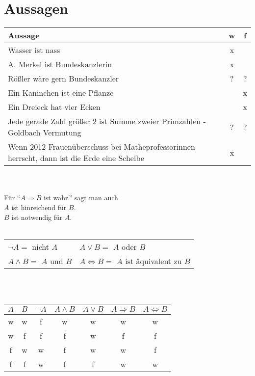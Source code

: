 \section{Aussagen}
\begin{center}
\begin{tabular}{l|c|c}
Aussage & w & f\\ \hline
Wasser ist nass & x & \\
A. Merkel ist Bundeskanzlerin & x & \\
Rößler wäre gern Bundeskanzler & ? & ?\\
Ein Kaninchen ist eine Pflanze & & x\\
Ein Dreieck hat vier Ecken & & x\\
Jede gerade Zahl größer 2 ist Summe zweier Primzahlen - Goldbach Vermutung & ? & ? \\
Wenn 2012 Frauenüberschuss bei Matheprofessorinnen herrscht, dann ist die Erde eine Scheibe & x &\\
\end{tabular}

\quad\\
\quad\\

Für "`$ A \Rightarrow B$ ist wahr."' sagt man auch \\
$A$ ist hinreichend für $B$. \\
$B$ ist notwendig für $A$. \\

\quad\\

\begin{tabular}{ll}
	$\neg A=$ nicht $A$ & $A \vee B =$ $A$ oder $B$\\
	$A \wedge B =$ $A$ und $B$ & $A \Leftrightarrow B =$ $A$ ist äquivalent zu $B$\\
\end{tabular}

\quad\\
\quad\\

\begin{tabular}{cc||ccccc}
$A$ & $B$ & $\neg A$ & $A \wedge B$ & $A \vee B$ & $A \Rightarrow B$ & $A \Leftrightarrow B$\\ \hline
w & w & f & w & w & w & w \\
w & f & f & f &w & f & f \\
f & w & w & f & w & w & f \\
f & f & w & f & f & w & w\\
\end{tabular}
\end{center}
%
%
%
